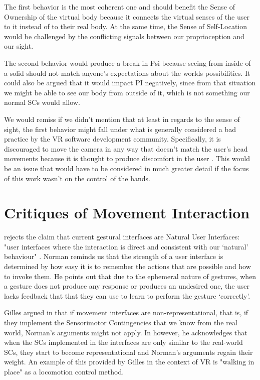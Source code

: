 The first behavior is the most coherent one and should benefit the Sense of Ownership of the virtual body because it connects the virtual senses of the user to it instead of to their real body. At the same time, the Sense of Self-Location would be challenged by the conflicting signals between our proprioception and our sight.

The second behavior would produce a break in Psi because seeing from inside of a solid should not match anyone's expectations about the worlds possibilities. It could also be argued that it would impact PI negatively, since from that situation we might be able to see our body from outside of it, which is not something our normal SCs would allow.

We would remiss if we didn't mention that at least in regards to the sense of sight, the first behavior might fall under what is generally considered a bad practice by the VR software development community. Specifically, it is discouraged to move the camera in any way that doesn't match the user's head movements because it is thought to produce discomfort in the user \parencite{UnityCamera, OculusCamera}. This would be an issue that would have to be considered in much greater detail if the focus of this work wasn't on the control of the hands.


\section{Critiques of Movement Interaction}
\label{sec:critiquesMovementInteraction}

\parencite{Norman2010} rejects the claim that current gestural interfaces are Natural User Interfaces: "user interfaces where the interaction is direct and consistent with our ‘natural’ behaviour" \parencite{HvasMortensen2017}. Norman reminds us that the strength of a user interface is determined by how easy it is to remember the actions that are possible and how to invoke them. He points out that due to the ephemeral nature of gestures, when a gesture does not produce any response or produces an undesired one, the user lacks feedback that that they can use to learn to perform the gesture ‘correctly’.

Gilles argued in \parencite{Gillies2014} that if movement interfaces are non-representational, that is, if they implement the Sensorimotor Contingencies that we know from the real world, Norman's arguments might not apply. In \parencite{Gillies2016} however, he acknowledges that when the SCs implemented in the interfaces are only similar to the real-world SCs, they start to become representational and Norman's arguments regain their weight. An example of this provided by Gilles in the context of VR is "walking in place" as a locomotion control method.


